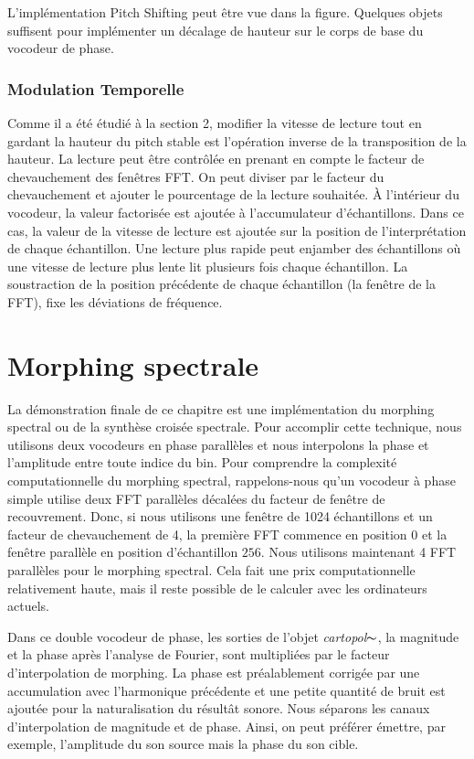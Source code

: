     L'implémentation Pitch Shifting peut être vue dans la figure. Quelques objets suffisent pour implémenter un décalage de hauteur sur le corps de base du vocodeur de phase.


\subsubsection{Modulation Temporelle}

    Comme il a été étudié à la section 2, modifier la vitesse de lecture tout en gardant la hauteur du pitch stable est l’opération inverse de la transposition de la hauteur. La lecture peut être contrôlée en prenant en compte le facteur de chevauchement des fenêtres FFT. On peut diviser par le facteur du chevauchement et ajouter le pourcentage de la lecture souhaitée. À l'intérieur du vocodeur, la valeur factorisée est ajoutée à l'accumulateur d'échantillons. Dans ce cas, la valeur de la vitesse de lecture est ajoutée sur la position de l'interprétation de chaque échantillon. Une lecture plus rapide peut enjamber des échantillons où une vitesse de lecture plus lente lit plusieurs fois chaque échantillon. La soustraction de la position précédente de chaque échantillon (la fenêtre de la FFT), fixe les déviations de fréquence. 

\section{Morphing spectrale}

La démonstration finale de ce chapitre est une implémentation du morphing spectral ou de la synthèse croisée spectrale. Pour accomplir cette technique, nous utilisons deux vocodeurs en phase parallèles et nous interpolons la phase et l’amplitude entre toute indice du bin. Pour comprendre la complexité computationnelle du morphing spectral, rappelons-nous qu'un vocodeur à phase simple utilise deux FFT parallèles décalées du facteur de fenêtre de recouvrement. Donc, si nous utilisons une fenêtre de 1024 échantillons et un facteur de chevauchement de 4, la première FFT commence en position $ 0 $ et la fenêtre parallèle en position d’échantillon $256$. Nous utilisons maintenant 4 FFT parallèles pour le morphing spectral. Cela fait une prix computationnelle relativement haute, mais il reste possible de le calculer avec les ordinateurs actuels.

Dans ce double vocodeur de phase, les sorties de l'objet \textit{cartopol}$ \thicksim $, la magnitude et la phase après l'analyse de Fourier, sont multipliées par le facteur d'interpolation de morphing. La phase est préalablement corrigée par une accumulation avec l'harmonique précédente et une petite quantité de bruit est ajoutée pour la naturalisation du résultât sonore. Nous séparons les canaux d’interpolation de magnitude et de phase. Ainsi, on peut préférer émettre, par exemple, l’amplitude du son source mais la phase du son cible.

